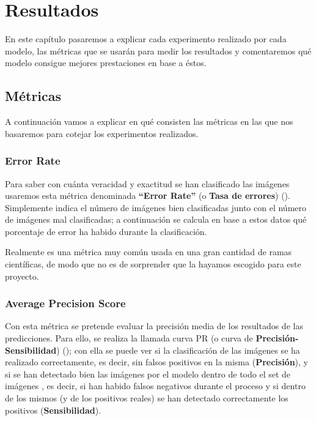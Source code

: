\chapter{Resultados}
\label{ch:res}

En este capítulo pasaremos a explicar cada experimento realizado por cada modelo, las métricas que se usarán para medir los resultados y comentaremos qué modelo consigue mejores prestaciones en base a éstos.

\section{Métricas}

A continuación vamos a explicar en qué consisten las métricas en las que nos basaremos para cotejar los experimentos realizados.

\subsection{Error Rate}

Para saber con cuánta veracidad y exactitud se han clasificado las imágenes usaremos esta métrica denominada \textbf{``Error Rate''} (o \textbf{Tasa de errores}) (\cite{error-rate}). Simplemente indica el número de imágenes bien clasificadas junto con el número de imágenes mal clasificadas; a continuación se calcula en base a estos datos qué porcentaje de error ha habido durante la clasificación.

Realmente es una métrica muy común usada en una gran cantidad de ramas científicas, de modo que no es de sorprender que la hayamos escogido para este proyecto.

\subsection{Average Precision Score}

Con esta métrica se pretende evaluar la precisión media de los resultados de las predicciones. Para ello, se realiza la llamada curva \ac{PR} (o curva de \textbf{Precisión-Sensibilidad}) (\cite{curvas-pr}); con ella se puede ver si la clasificación de las imágenes se ha realizado correctamente, es decir, sin falsos positivos en la misma (\textbf{Precisión}), y si se han detectado bien las imágenes por el modelo dentro de todo el set de imágenes , es decir, si han habido falsos negativos durante el proceso y si dentro de los mismos (y de los positivos reales) se han detectado correctamente los positivos (\textbf{Sensibilidad}). %

